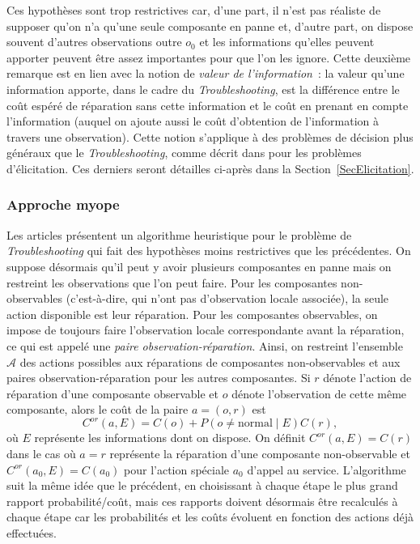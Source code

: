 \documentclass[a4paper,11pt]{article}
\theoremstyle{plain}
\begin{document}
Ces hypothèses sont trop restrictives car, d'une part, il n'est pas réaliste de supposer qu'on n'a qu'une seule composante en panne et, d'autre part, on dispose souvent d'autres observations outre $o_0$ et les informations qu'elles peuvent apporter peuvent être assez importantes pour que l'on les ignore. Cette deuxième remarque est en lien avec la notion de \emph{valeur de l'information}~: la valeur qu'une information apporte, dans le cadre du \emph{Troubleshooting}, est la différence entre le coût espéré de réparation sans cette information et le coût en prenant en compte l'information (auquel on ajoute aussi le coût d'obtention de l'information à travers une observation). Cette notion s'applique à des problèmes de décision plus généraux que le \emph{Troubleshooting}, comme décrit dans \cite{Braziunas_2008} pour les problèmes d'élicitation. Ces derniers seront détailles ci-après dans la Section~\ref{SecElicitation}.

\subsubsection{Approche myope}
\label{SecMyope}

Les articles \cite{heckerman1994troubleshooting, Heckerman_1995} présentent un algorithme heuristique pour le problème de \emph{Troubleshooting} qui fait des hypothèses moins restrictives que les précédentes. On suppose désormais qu'il peut y avoir plusieurs composantes en panne mais on restreint les observations que l'on peut faire. Pour les composantes non-observables (c'est-à-dire, qui n'ont pas d'observation locale associée), la seule action disponible est leur réparation. Pour les composantes observables, on impose de toujours faire l'observation locale correspondante avant la réparation, ce qui est appelé une \emph{paire observation-réparation}. Ainsi, on restreint l'ensemble $\mathcal A$ des actions possibles aux réparations de composantes non-observables et aux paires observation-réparation pour les autres composantes. Si $r$ dénote l'action de réparation d'une composante observable et $o$ dénote l'observation de cette même composante, alors le coût de la paire $a = (o, r)$ est
\begin{equation}
\label{EqCor}
C^{or}(a, E) = C(o) + P(o \neq \text{normal} \mid E) C(r),
\end{equation}
où $E$ représente les informations dont on dispose. On définit $C^{or}(a, E) = C(r)$ dans le cas où $a = r$ représente la réparation d'une composante non-observable et $C^{or}(a_0, E) = C(a_0)$ pour l'action spéciale $a_0$ d'appel au service. L'algorithme suit la même idée que le précédent, en choisissant à chaque étape le plus grand rapport probabilité/coût, mais ces rapports doivent désormais être recalculés à chaque étape car les probabilités et les coûts évoluent en fonction des actions déjà effectuées.
\end{document}
